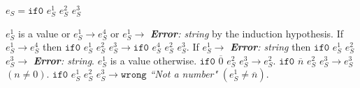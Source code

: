 \begin{case}

$e_{S}=\mathtt{if0}$ $e_{S}^{1}$ $e_{S}^{2}$ $e_{S}^{3}$

$e_{S}^{1}$ is a value or $e_{S}^{1}\rightarrow e_{S}^{4}$ or $e_{S}^{1}\rightarrow$ \emph{\textbf{Error}: string} by the induction hypothesis.  If $e_{S}^{1}\rightarrow e_{S}^{4}$ then $\mathtt{if0}$ $e_{S}^{1}$ $e_{S}^{2}$ $e_{S}^{3}\rightarrow \mathtt{if0}$ $e_{S}^{4}$ $e_{S}^{2}$ $e_{S}^{3}$.  If $e_{S}^{1}\rightarrow$ \emph{\textbf{Error}: string} then $\mathtt{if0}$ $e_{S}^{1}$ $e_{S}^{2}$ $e_{S}^{3}\rightarrow$ \emph{\textbf{Error}: string}.  $e_{S}^{1}$ is a value otherwise.  $\mathtt{if0}$ $\overline{0}$ $e_{S}^{2}$ $e_{S}^{3}\rightarrow e_{S}^{2}$.  $\mathtt{if0}$ $\overline{n}$ $e_{S}^{2}$ $e_{S}^{3}\rightarrow e_{S}^{3}$ $(n\neq 0)$.  $\mathtt{if0}$ $e_{S}^{1}$ $e_{S}^{2}$ $e_{S}^{3}\rightarrow\mathtt{wrong}$ \emph{``Not a number"} $(e_{S}^{1}\neq\overline{n})$.

\end{case}